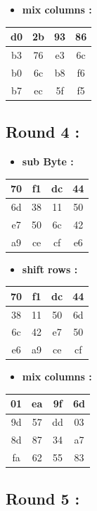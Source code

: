 \documentclass{article}
\begin{document}
\begin{itemize}
    \item \textbf{mix columns :}
\end{itemize} \begin{tabular}{|c|c|c|c|}
\hline d0 & 2b & 93 & 86 \\ \hline b3 & 76 & e3 & 6c \\ \hline b0 & 6c & b8 & f6 \\ \hline b7 & ec & 5f & f5 \\ \hline \end{tabular}\hspace{0.5cm}\vspace{0.1cm}\subsection*{Round 4 : }\begin{itemize}
    \item \textbf{sub Byte :}
\end{itemize} \begin{tabular}{|c|c|c|c|}
\hline 70 & f1 & dc & 44 \\ \hline 6d & 38 & 11 & 50 \\ \hline e7 & 50 & 6c & 42 \\ \hline a9 & ce & cf & e6 \\ \hline \end{tabular}\hspace{0.5cm}\vspace{0.1cm}\begin{itemize}
    \item \textbf{shift rows :}
\end{itemize} \begin{tabular}{|c|c|c|c|}
\hline 70 & f1 & dc & 44 \\ \hline 38 & 11 & 50 & 6d \\ \hline 6c & 42 & e7 & 50 \\ \hline e6 & a9 & ce & cf \\ \hline \end{tabular}\hspace{0.5cm}\vspace{0.1cm}\begin{itemize}
    \item \textbf{mix columns :}
\end{itemize} \begin{tabular}{|c|c|c|c|}
\hline 01 & ea & 9f & 6d \\ \hline 9d & 57 & dd & 03 \\ \hline 8d & 87 & 34 & a7 \\ \hline fa & 62 & 55 & 83 \\ \hline \end{tabular}\hspace{0.5cm}\vspace{0.1cm}\subsection*{Round 5 : }\begin{itemize}

\end{itemize}
\end{document}
